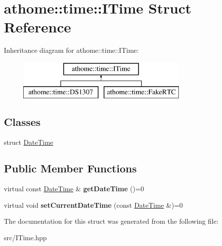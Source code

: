 \hypertarget{structathome_1_1time_1_1_i_time}{}\section{athome\+:\+:time\+:\+:I\+Time Struct Reference}
\label{structathome_1_1time_1_1_i_time}
Inheritance diagram for athome\+:\+:time\+:\+:I\+Time\+:\begin{figure}[H]
\begin{center}
\leavevmode
\includegraphics[height=2.000000cm]{structathome_1_1time_1_1_i_time}
\end{center}
\end{figure}
\subsection*{Classes}
\begin{DoxyCompactItemize}
\item 
struct \mbox{\hyperlink{structathome_1_1time_1_1_i_time_1_1_date_time}{Date\+Time}}
\end{DoxyCompactItemize}
\subsection*{Public Member Functions}
\begin{DoxyCompactItemize}
\item 
\mbox{\label{structathome_1_1time_1_1_i_time_a5ffc0cb263c36f1c466fe29322925db7}} 
virtual const \mbox{\hyperlink{structathome_1_1time_1_1_i_time_1_1_date_time}{Date\+Time}} \& {\bfseries get\+Date\+Time} ()=0
\item 
\mbox{\label{structathome_1_1time_1_1_i_time_acfcb9e53a8202ade38ab38d2639ebb7b}} 
virtual void {\bfseries set\+Current\+Date\+Time} (const \mbox{\hyperlink{structathome_1_1time_1_1_i_time_1_1_date_time}{Date\+Time}} \&)=0
\end{DoxyCompactItemize}


The documentation for this struct was generated from the following file\+:\begin{DoxyCompactItemize}
\item 
src/I\+Time.\+hpp\end{DoxyCompactItemize}
